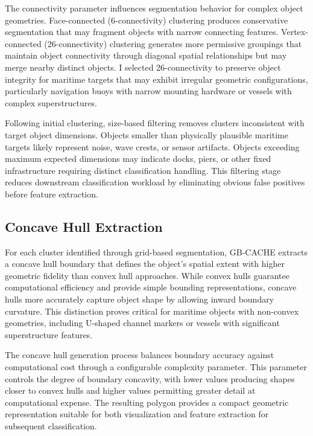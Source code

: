 \documentclass{erauthesis}
\begin{document}
The connectivity parameter influences segmentation behavior for complex object geometries.
Face-connected (6-connectivity) clustering produces conservative segmentation that may fragment objects with narrow connecting features.
Vertex-connected (26-connectivity) clustering generates more permissive groupings that maintain object connectivity through diagonal spatial relationships but may merge nearby distinct objects.
I selected 26-connectivity to preserve object integrity for maritime targets that may exhibit irregular geometric configurations, particularly navigation buoys with narrow mounting hardware or vessels with complex superstructures.

Following initial clustering, size-based filtering removes clusters inconsistent with target object dimensions.
Objects smaller than physically plausible maritime targets likely represent noise, wave crests, or sensor artifacts.
Objects exceeding maximum expected dimensions may indicate docks, piers, or other fixed infrastructure requiring distinct classification handling.
This filtering stage reduces downstream classification workload by eliminating obvious false positives before feature extraction.

\subsection{Concave Hull Extraction} \label{sec:ccHull_extract}

For each cluster identified through grid-based segmentation, \ac{GB-CACHE} extracts a concave hull boundary that defines the object's spatial extent with higher geometric fidelity than convex hull approaches.
While convex hulls guarantee computational efficiency and provide simple bounding representations, concave hulls more accurately capture object shape by allowing inward boundary curvature.
This distinction proves critical for maritime objects with non-convex geometries, including U-shaped channel markers or vessels with significant superstructure features.

The concave hull generation process balances boundary accuracy against computational cost through a configurable complexity parameter.
This parameter controls the degree of boundary concavity, with lower values producing shapes closer to convex hulls and higher values permitting greater detail at computational expense.
The resulting polygon provides a compact geometric representation suitable for both visualization and feature extraction for subsequent classification.
\end{document}
